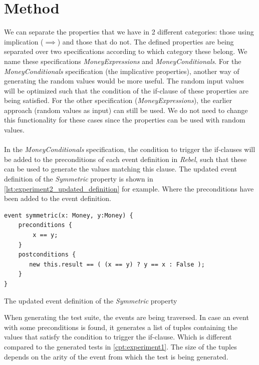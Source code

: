 \section{Method}
\label{sct:experiment2_method}
We can separate the properties that we have in 2 different categories: those
using implication ($\implies$) and those that do not. The defined properties are
being separated over two specifications according to which category these
belong. We name these specifications \textit{MoneyExpressions} and
\textit{MoneyConditionals}. For the \textit{MoneyConditionals} specification
(the implicative properties), another way of generating the random values would be
more useful. The random input values will be optimized such that the condition
of the if-clause of these properties are being satisfied. For the other
specification (\textit{MoneyExpressions}), the earlier approach (random values
as input) can still be used. We do not need to change this functionality for
these cases since the properties can be used with random values.\\
\\
In the \textit{MoneyConditionals} specification, the condition to trigger the
if-clauses will be added to the preconditions of each event definition in \textit{Rebel}, such
that these can be used to generate the values matching this clause. The updated
event definition of the \textit{Symmetric} property is shown in
\autoref{lst:experiment2_updated_definition} for example. Where the
preconditions have been added to the event definition.
\begin{sourcecode}[!ht]
\begin{lstlisting}[language=Rebel]
event symmetric(x: Money, y:Money) {
    preconditions {
        x == y;
    }
    postconditions {
       new this.result == ( (x == y) ? y == x : False );
    }
}
\end{lstlisting}
\caption{The updated event definition of the \textit{Symmetric} property}
\label{lst:experiment2_updated_definition}
\end{sourcecode}
\FloatBarrier\noindent
When generating the test suite, the events are being traversed. In case an
event with some preconditions is found, it generates a list of tuples containing the values that
satisfy the condition to trigger the if-clause. Which is different compared to
the generated tests in \autoref{cpt:experiment1}. The size of the tuples depends
on the arity of the event from which the test is being generated.\\
